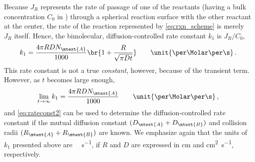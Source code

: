 Because \( J_R \) represents the rate of passage of one of the reactants (having a bulk concentration \( C_0 \) in \unit{\Molar}) through a spherical reaction surface with the other reactant at the center, the rate of the reaction represented by \cref{eq:rxn_scheme} is merely \( J_R \) itself. 
Hence, the bimolecular, diffusion-controlled rate constant \( k_1 \) is \( J_R/C_0 \),
\begin{equation}
	k_1 = \frac{4 \pi R D N_\mtext{A}}{1000} \br{ 1 + \frac{R}{\sqrt{\pi D t}}} \qquad \unit{\per\Molar \per\s} \, .
	\label{eq:rateconst1}
\end{equation} 
This rate constant is not a true \emph{constant}, however, because of the transient term. 
However, as \( t \) becomes large enough,
\begin{equation}
	\lim_{t \to \infty} k_1 = \frac{4 \pi R D N_\mtext{A}}{1000} \qquad \unit{\per\Molar \per\s} \, ,
	\label{eq:rateconst2}
\end{equation}
and \cref{eq:rateconst2} can be used to determine the diffusion-controlled rate constant if the mutual diffusion constant \( (D_\mtext{A} + D_\mtext{B}) \) and collision radii \( (R_\mtext{A} + R_\mtext{B}) \) are known.
We emphasize again that the units of \( k_1 \) presented above are \unit{\per\Molar \per \s}, if \( R \) and \( D \) are expressed in \unit{\cm} and \unit{\cm\squared \per \s}, respectively. 

